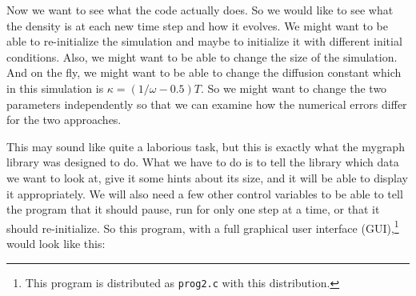 \documentclass[12pt,letterpaper]{article}
\begin{document}
Now we want to see what the code actually does. So we would like to
see what the density is at each new time step and how it evolves. We
might want to be able to re-initialize the simulation and maybe to
initialize it with different initial conditions. Also, we might want to
be able to change the size of the simulation. And on the fly, we might
want to be able to change the diffusion constant which in this
simulation is $\kappa=(1/\omega-0.5)T$. So we might want to change the
two parameters independently so that we can examine how the numerical
errors differ for the two approaches.

This may sound like quite a laborious task, but this is exactly what the
mygraph library was designed to do. What we have to do is to tell the
library which data we want to look at, give it some hints about its
size, and it will be able to display it appropriately. We will also
need a few other control variables to be able to tell the program that
it should pause, run for only one step at a time, or that it should
re-initialize. So this program, with a full graphical user interface
(GUI),\footnote{This program is distributed as \texttt{prog2.c} with
  this distribution.} would look like this:  
\end{document}
